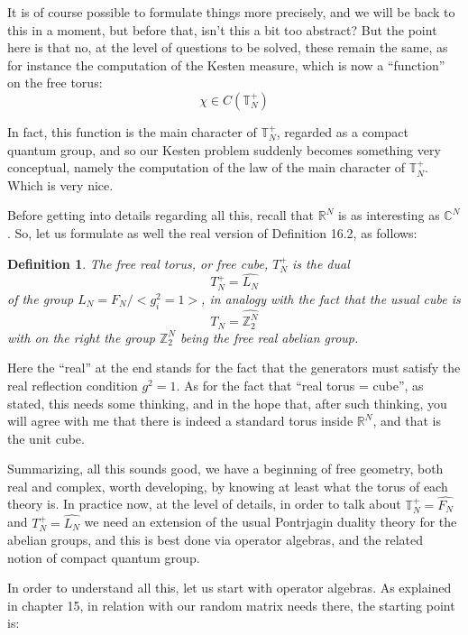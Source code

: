 \documentclass[12pt]{amsbook}
\newtheorem{definition}[theorem]{Definition}
\begin{document}
It is of course possible to formulate things more precisely, and we will be back to this in a moment, but before that, isn't this a bit too abstract? But the point here is that no, at the level of questions to be solved, these remain the same, as for instance the computation of the Kesten measure, which is now a ``function'' on the free torus:
$$\chi\in C(\mathbb T_N^+)$$

In fact, this function is the main character of $\mathbb T_N^+$, regarded as a compact quantum group, and so our Kesten problem suddenly becomes something very conceptual, namely the computation of the law of the main character of $\mathbb T_N^+$. Which is very nice.

\bigskip

Before getting into details regarding all this, recall that $\mathbb R^N$ is as interesting as $\mathbb C^N$. So, let us formulate as well the real version of Definition 16.2, as follows:

\begin{definition}
The free real torus, or free cube, $T_N^+$ is the dual 
$$T_N^+=\widehat{L_N}$$
of the group $L_N=F_N/<g_i^2=1>$, in analogy with the fact that the usual cube is
$$T_N=\widehat{\mathbb Z_2^N}$$
with on the right the group $\mathbb Z_2^N$ being the free real abelian group.
\end{definition}

Here the ``real'' at the end stands for the fact that the generators must satisfy the real reflection condition $g^2=1$. As for the fact that ``real torus = cube'', as stated, this needs some thinking, and in the hope that, after such thinking, you will agree with me that there is indeed a standard torus inside $\mathbb R^N$, and that is the unit cube.

\bigskip

Summarizing, all this sounds good, we have a beginning of free geometry, both real and complex, worth developing, by knowing at least what the torus of each theory is. In practice now, at the level of details, in order to talk about $\mathbb T_N^+=\widehat{F_N}$ and $T_N^+=\widehat{L_N}$ we need an extension of the usual Pontrjagin duality theory for the abelian groups, and this is best done via operator algebras, and the related notion of compact quantum group. 

\bigskip

In order to understand all this, let us start with operator algebras. As explained in chapter 15, in relation with our random matrix needs there, the starting point is:
\end{document}
